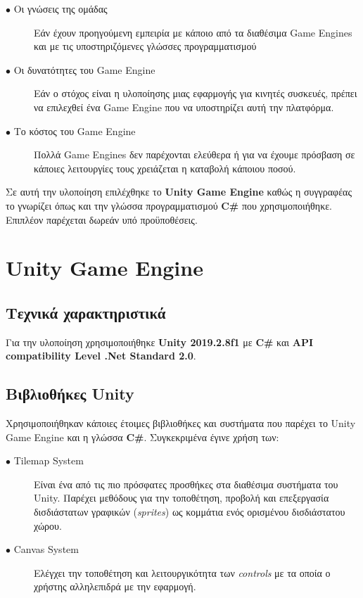 \begin{description}
\item[$\bullet$ Οι γνώσεις της ομάδας] Εάν έχουν προηγούμενη εμπειρία με κάποιο από τα διαθέσιμα Game Engines και με τις υποστηριζόμενες γλώσσες προγραμματισμού
\item[$\bullet$ Οι δυνατότητες του Game Engine] Εάν ο στόχος είναι η υλοποίησης μιας εφαρμογής για κινητές συσκευές, πρέπει να επιλεχθεί ένα Game Engine που να υποστηρίζει αυτή την πλατφόρμα.
\item[$\bullet$ Το κόστος του Game Engine] Πολλά Game Engines δεν παρέχονται ελεύθερα ή για να έχουμε πρόσβαση σε κάποιες λειτουργίες τους χρειάζεται η καταβολή κάποιου ποσού.
\end{description}

\par
Σε αυτή την υλοποίηση επιλέχθηκε το \textbf{Unity Game Engine} καθώς η συγγραφέας το γνωρίζει όπως και την γλώσσα προγραμματισμού \textbf{C\#} που χρησιμοποιήθηκε. Επιπλέον παρέχεται δωρεάν υπό προϋποθέσεις.


\section{Unity Game Engine}

\subsection{Τεχνικά χαρακτηριστικά}
Για την υλοποίηση χρησιμοποιήθηκε \textbf{Unity 2019.2.8f1} με \textbf{C\#} και \textbf{API compatibility Level .Net Standard 2.0}. 

\subsection{Βιβλιοθήκες Unity}
Χρησιμοποιήθηκαν κάποιες έτοιμες βιβλιοθήκες και συστήματα που παρέχει το Unity Game Engine και η γλώσσα \textbf{C\#}. Συγκεκριμένα έγινε χρήση των:

\begin{description}
\item[$\bullet$ Tilemap System] Είναι ένα από τις πιο πρόσφατες προσθήκες στα διαθέσιμα συστήματα του Unity. Παρέχει μεθόδους για την τοποθέτηση, προβολή και επεξεργασία δισδιάστατων γραφικών (\textit{sprites}) ως κομμάτια ενός ορισμένου δισδιάστατου χώρου. \cite{unitytilemap}
\item[$\bullet$ Canvas System] Ελέγχει την τοποθέτηση και λειτουργικότητα των \textit{controls} με τα οποία ο χρήστης αλληλεπιδρά με την εφαρμογή. \cite{unitycanvas}
\end{description}


